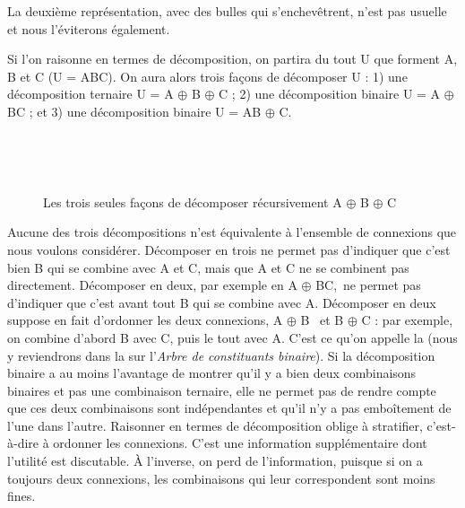 La deuxième représentation, avec des bulles qui s’enchevêtrent, n’est pas usuelle et nous l’éviterons également.

Si l’on raisonne en termes de décomposition, on partira du tout U que forment A, B et C (U = ABC). On aura alors trois façons de décomposer U : 1) une décomposition ternaire U = A ${\oplus}$ B ${\oplus}$ C ; 2) une décomposition binaire U = A ${\oplus}$ BC ; et 3) une décomposition binaire U = AB ${\oplus}$ C.

\begin{figure}
\\\medskip
{}\\\medskip
{}
\caption{\label{fig:}Les trois seules façons de décomposer récursivement A $\oplus$ B $\oplus$ C}
\end{figure}

Aucune des trois décompositions n’est équivalente à l’ensemble de connexions que nous voulons considérer. Décomposer en trois ne permet pas d’indiquer que c’est bien B qui se combine avec A et C, mais que A et C ne se combinent pas directement. Décomposer en deux, par exemple en A ${\oplus}$ BC,~ne permet pas d’indiquer que c’est avant tout B qui se combine avec A. Décomposer en deux suppose en fait d’ordonner les deux connexions, A ${\oplus}$ B~ et B ${\oplus}$ C : par exemple, on combine d’abord B avec C, puis le tout avec A. C’est ce qu’on appelle la  (nous y reviendrons dans la  sur l’\textit{Arbre de constituants binaire}). Si la décomposition binaire a au moins l’avantage de montrer qu’il y a bien deux combinaisons binaires et pas une combinaison ternaire, elle ne permet pas de rendre compte que ces deux combinaisons sont indépendantes et qu’il n’y a pas emboîtement de l’une dans l’autre. Raisonner en termes de décomposition oblige à stratifier, c’est-à-dire à ordonner les connexions. C’est une information supplémentaire dont l’utilité est discutable. À l’inverse, on perd de l’information, puisque si on a toujours deux connexions, les combinaisons qui leur correspondent sont moins fines.

